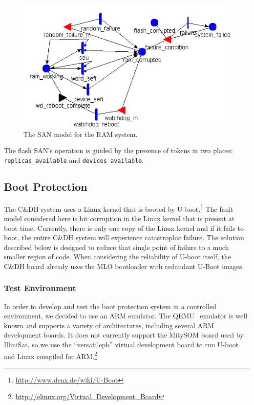 \begin{figure}
\centering
\includegraphics[scale=0.8]{ram_system}
\caption{The SAN model for the RAM system.}
\label{fig:ramsan}
\end{figure}

The flash SAN's operation is guided by the presence of tokens in two places: \texttt{replicas\_available} and \texttt{devices\_available}.

\subsection{Boot Protection}

The C\&DH system uses a Linux kernel that is booted by
U-boot.\footnote{\url{http://www.denx.de/wiki/U-Boot}} The fault model
considered here is bit corruption in the Linux kernel that is present at boot
time.  Currently, there is only one copy of the Linux kernel and if it fails to
boot, the entire C\&DH system will experience catastrophic failure.  The
solution described below is designed to reduce that single point of failure to a
much smaller region of code.  When considering the reliability of U-boot itself,
the C\&DH board already uses the MLO bootloader with redundant U-Boot images.

\subsubsection{Test Environment}
In order to develop and test the boot protection system in a controlled
environment, we decided to use an ARM emulator.  The QEMU~\cite{bellard2005qemu}
emulator is well known and supports a variety of architectures, including
several ARM development boards.  It does not currently support the MitySOM board
used by IlliniSat, so we use the ``versatilepb'' virtual development board to
run U-boot and Linux compiled for
ARM.\footnote{\url{http://elinux.org/Virtual_Development_Board}}


